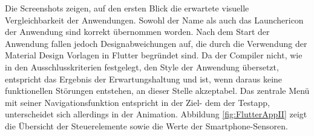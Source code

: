 Die Screenshots zeigen,  auf den ersten Blick die erwartete visuelle Vergleichbarkeit der Anwendungen.  Sowohl der Name als auch das Launchericon der Anwendung sind korrekt übernommen worden.  Nach dem Start der Anwendung fallen jedoch Designabweichungen auf, die durch die Verwendung der Material Design Vorlagen in Flutter begründet sind. Da der Compiler nicht,  wie in den Ausschlusskriterien festgelegt, den Style der Anwendung übersetzt,  entspricht das Ergebnis der Erwartungshaltung und ist, wenn daraus keine funktionellen Störungen 
entstehen,  an dieser Stelle akzeptabel.  Das zentrale Menü mit seiner Navigationsfunktion entspricht in der Ziel- dem der Testapp,  
unterscheidet sich allerdings in der Animation. Abbildung \ref{fig:FlutterAppII} zeigt die Übersicht der Steuerelemente sowie die Werte der Smartphone-Sensoren.

